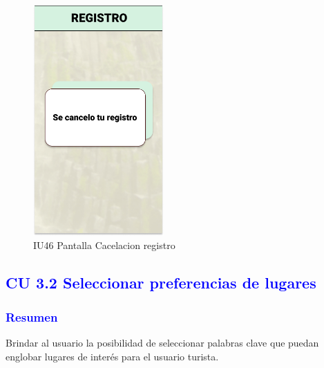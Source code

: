 \begin{figure}[htbp]
        \centering
        \includegraphics[width= 5cm]{Pantallas Prototipo3/IU46 Pantalla Cacelacion registro.jpg}
        \caption{IU46 Pantalla Cacelacion registro}
        \label{fig:enter-label}
\end{figure}

\pagebreak
             




\subsection{\textcolor{blue}{CU 3.2 Seleccionar preferencias de lugares}}
\subsubsection{\textcolor{blue}{Resumen}}
Brindar al usuario la posibilidad de seleccionar palabras clave que puedan englobar lugares de interés para el usuario turista. 
